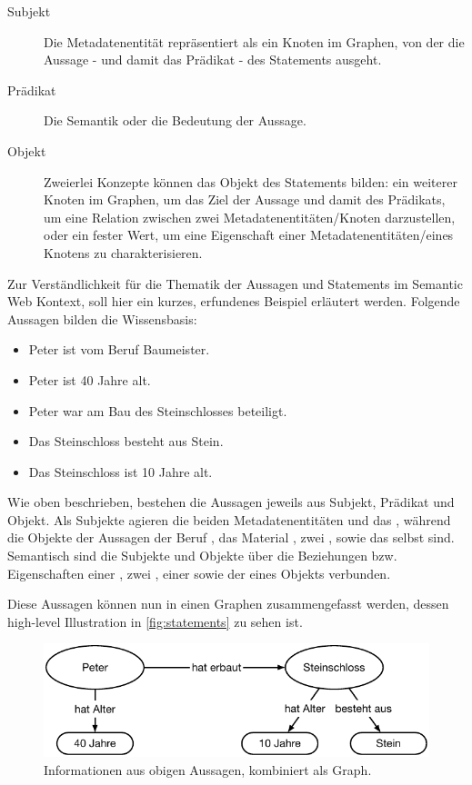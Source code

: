 \begin{description}
	\item[Subjekt] Die Metadatenentität repräsentiert als ein Knoten im Graphen, von der die Aussage - und damit das Prädikat - des Statements ausgeht.
	\item[Prädikat] Die Semantik oder die Bedeutung der Aussage.
	\item[Objekt] Zweierlei Konzepte können das Objekt des Statements bilden: ein weiterer Knoten im Graphen, um das Ziel der Aussage und damit des Prädikats, um eine Relation zwischen zwei Metadatenentitäten/Knoten darzustellen, oder ein fester Wert, um eine Eigenschaft einer Metadatenentitäten/eines Knotens zu charakterisieren.
\end{description}

Zur Verständlichkeit für die Thematik der Aussagen und Statements im Semantic Web Kontext, soll hier ein kurzes, erfundenes Beispiel erläutert werden. Folgende Aussagen bilden die Wissensbasis:

\begin{itemize}
	\item Peter ist vom Beruf Baumeister.
	\item Peter ist 40 Jahre alt.
	\item Peter war am Bau des Steinschlosses beteiligt.
	\item Das Steinschloss besteht aus Stein.
	\item Das Steinschloss ist 10 Jahre alt.
\end{itemize}

Wie oben beschrieben, bestehen die Aussagen jeweils aus Subjekt, Prädikat und Objekt. Als Subjekte agieren die beiden Metadatenentitäten  und das , während die Objekte der Aussagen der Beruf , das Material , zwei , sowie das  selbst sind. Semantisch sind die Subjekte und Objekte über die Beziehungen bzw. Eigenschaften einer , zwei , einer  sowie der  eines Objekts verbunden.

Diese Aussagen können nun in einen Graphen zusammengefasst werden, dessen high-level Illustration in \autoref{fig:statements} zu sehen ist.

\begin{figure}[htb]
    \centering
    \includegraphics[width=\textwidth]{Figures/berndl/statements}
    \caption{\label{fig:statements} Informationen aus obigen Aussagen, kombiniert als Graph.}
\end{figure}

